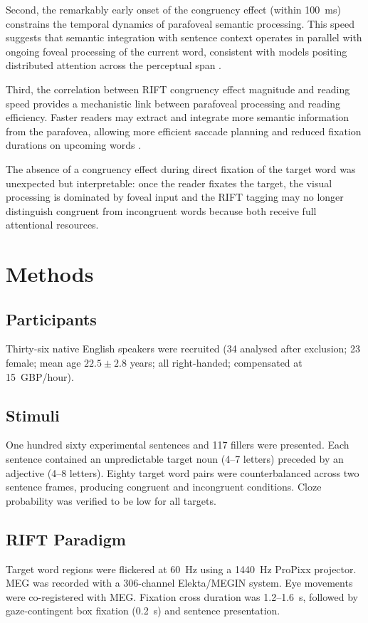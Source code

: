 \documentclass[11pt]{article}
\begin{document}
Second, the remarkably early onset of the congruency effect (within 100~ms) constrains the temporal dynamics of parafoveal semantic processing. This speed suggests that semantic integration with sentence context operates in parallel with ongoing foveal processing of the current word, consistent with models positing distributed attention across the perceptual span \citep{engbert2005swift, kliegl2006tracking}.

Third, the correlation between RIFT congruency effect magnitude and reading speed provides a mechanistic link between parafoveal processing and reading efficiency. Faster readers may extract and integrate more semantic information from the parafovea, allowing more efficient saccade planning and reduced fixation durations on upcoming words \citep{veldre2017parafoveal, reichle2009using}.

The absence of a congruency effect during direct fixation of the target word was unexpected but interpretable: once the reader fixates the target, the visual processing is dominated by foveal input and the RIFT tagging may no longer distinguish congruent from incongruent words because both receive full attentional resources.

\section{Methods}

\subsection{Participants}
Thirty-six native English speakers were recruited (34 analysed after exclusion; 23 female; mean age $22.5 \pm 2.8$ years; all right-handed; compensated at 15~GBP/hour).

\subsection{Stimuli}
One hundred sixty experimental sentences and 117 fillers were presented. Each sentence contained an unpredictable target noun (4--7 letters) preceded by an adjective (4--8 letters). Eighty target word pairs were counterbalanced across two sentence frames, producing congruent and incongruent conditions. Cloze probability was verified to be low for all targets.

\subsection{RIFT Paradigm}
Target word regions were flickered at 60~Hz using a 1440~Hz ProPixx projector. MEG was recorded with a 306-channel Elekta/MEGIN system. Eye movements were co-registered with MEG. Fixation cross duration was 1.2--1.6~s, followed by gaze-contingent box fixation (0.2~s) and sentence presentation.
\end{document}
